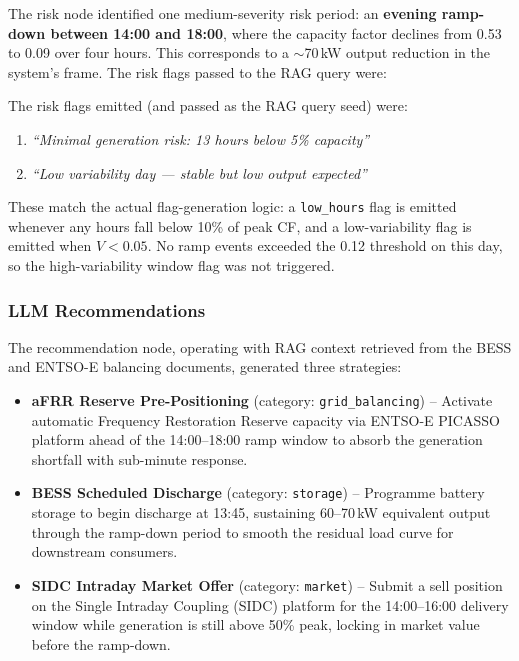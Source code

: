 \documentclass[12pt, a4paper]{article}
\begin{document}
The risk node identified one medium-severity risk period: an \textbf{evening ramp-down between 14:00 and 18:00}, where the capacity factor declines from 0.53 to 0.09 over four hours. This corresponds to a $\sim$70\,kW output reduction in the system's frame. The risk flags passed to the RAG query were:

The risk flags emitted (and passed as the RAG query seed) were:
\begin{enumerate}[noitemsep]
    \item \textit{``Minimal generation risk: 13 hours below 5\% capacity''}
    \item \textit{``Low variability day --- stable but low output expected''}
\end{enumerate}

These match the actual flag-generation logic: a \texttt{low\_hours} flag is emitted whenever any hours fall below 10\% of peak CF, and a low-variability flag is emitted when $V < 0.05$. No ramp events exceeded the 0.12 threshold on this day, so the high-variability window flag was not triggered.

\clearpage
\subsubsection{LLM Recommendations}

The recommendation node, operating with RAG context retrieved from the BESS and ENTSO-E balancing documents, generated three strategies:

\begin{itemize}[noitemsep]
    \item \textbf{aFRR Reserve Pre-Positioning} (category: \texttt{grid\_balancing}) -- Activate automatic Frequency Restoration Reserve capacity via ENTSO-E PICASSO platform ahead of the 14:00--18:00 ramp window to absorb the generation shortfall with sub-minute response.
    \item \textbf{BESS Scheduled Discharge} (category: \texttt{storage}) -- Programme battery storage to begin discharge at 13:45, sustaining 60--70\,kW equivalent output through the ramp-down period to smooth the residual load curve for downstream consumers.
    \item \textbf{SIDC Intraday Market Offer} (category: \texttt{market}) -- Submit a sell position on the Single Intraday Coupling (SIDC) platform for the 14:00--16:00 delivery window while generation is still above 50\% peak, locking in market value before the ramp-down.
\end{itemize}
\end{document}

